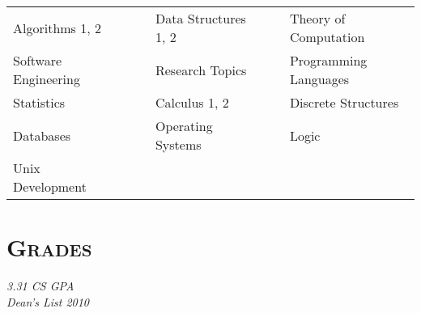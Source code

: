 \begin{resume}
\begin{tabular}{lllll}
  Algorithms 1, 2        & \ \ & Data Structures 1, 2& \ \ & Theory of Computation \\
  Software Engineering   & \ \ & Research Topics     & \ \ & Programming Languages \\
  Statistics             & \ \ & Calculus 1, 2       & \ \ & Discrete Structures \\
  Databases              & \ \ & Operating Systems   & \ \ & Logic \\
  Unix Development       & \ \ &

  \end{tabular}

\section{\textsc{Grades}}
\emph{3.31 CS GPA} \\
\emph{Dean's List 2010}

\end{resume}

